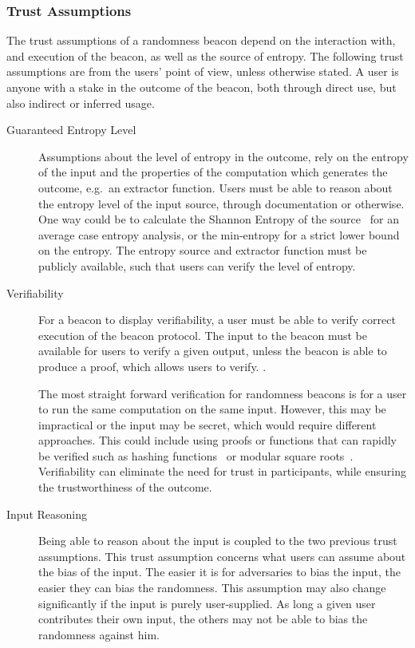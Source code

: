 \subsubsection{Trust Assumptions}\label{ssub:trust_assumptions}
The trust assumptions of a randomness beacon depend on the interaction with, and execution of the beacon, as well as the source of entropy.
The following trust assumptions are from the users' point of view, unless otherwise stated.
A user is anyone with a stake in the outcome of the beacon, both through direct use, but also indirect or inferred usage.
\begin{description}

    \item[Guaranteed Entropy Level]
        Assumptions about the level of entropy in the outcome, rely on the entropy of the input and the properties of the computation which generates the outcome, e.g.\ an extractor function.
        Users must be able to reason about the entropy level of the input source, through documentation or otherwise. One way could be to calculate the Shannon Entropy of the source~\cite{informationtheory} for an average case entropy analysis, or the min-entropy for a strict lower bound on the entropy.
        The entropy source and extractor function must be publicly available, such that users can verify the level of entropy.

    \item[Verifiability]
        For a beacon to display verifiability, a user must be able to verify correct execution of the beacon protocol.
        The input to the beacon must be available for users to verify a given output, unless the beacon is able to produce a proof, which allows users to verify.  .

        The most straight forward verification for randomness beacons is for a user to run the same computation on the same input.
However, this may be impractical or the input may be secret, which would require different approaches.
This could include using proofs or functions that can rapidly be verified such as hashing functions~\cite{nakamoto2008bitcoin} or modular square roots~\cite{lenstra2015random}.
        Verifiability can eliminate the need for trust in participants, while ensuring the trustworthiness of the outcome.

    \item[Input Reasoning]
        Being able to reason about the input is coupled to the two previous trust assumptions.
This trust assumption concerns what users can assume about the bias of the input.
        The easier it is for adversaries to bias the input, the easier they can bias the randomness.
        This assumption may also change significantly if the input is purely user-supplied.
As long a given user contributes their own input, the others may not be able to bias the randomness against him.

\end{description}

